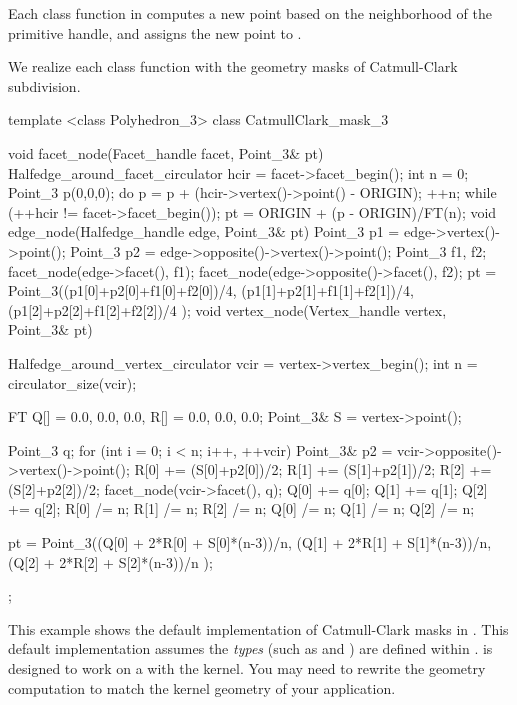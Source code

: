 Each class function in  
computes a new point based on the neighborhood of the primitive 
handle, and assigns the new point to . 

We realize each class function with the geometry masks of 
Catmull-Clark subdivision. 

\begin{ccExampleCode}
template <class Polyhedron_3>
class CatmullClark_mask_3 {
  void facet_node(Facet_handle facet, Point_3& pt) {
    Halfedge_around_facet_circulator hcir = facet->facet_begin();
    int n = 0;
    Point_3 p(0,0,0);
    do {
      p = p + (hcir->vertex()->point() - ORIGIN);
      ++n;
    } while (++hcir != facet->facet_begin());
    pt = ORIGIN + (p - ORIGIN)/FT(n);
  }
  void edge_node(Halfedge_handle edge, Point_3& pt) {
    Point_3 p1 = edge->vertex()->point();
    Point_3 p2 = edge->opposite()->vertex()->point();
    Point_3 f1, f2;
    facet_node(edge->facet(), f1);
    facet_node(edge->opposite()->facet(), f2);
    pt = Point_3((p1[0]+p2[0]+f1[0]+f2[0])/4,
                 (p1[1]+p2[1]+f1[1]+f2[1])/4,
                 (p1[2]+p2[2]+f1[2]+f2[2])/4 );
  }
  void vertex_node(Vertex_handle vertex, Point_3& pt) {
    Halfedge_around_vertex_circulator vcir = vertex->vertex_begin();
    int n = circulator_size(vcir);    

    FT Q[] = {0.0, 0.0, 0.0}, R[] = {0.0, 0.0, 0.0};
    Point_3& S = vertex->point();
    
    Point_3 q;
    for (int i = 0; i < n; i++, ++vcir) {
      Point_3& p2 = vcir->opposite()->vertex()->point();
      R[0] += (S[0]+p2[0])/2;
      R[1] += (S[1]+p2[1])/2;
      R[2] += (S[2]+p2[2])/2;
      facet_node(vcir->facet(), q);
      Q[0] += q[0];      
      Q[1] += q[1];      
      Q[2] += q[2];
    }
    R[0] /= n;    R[1] /= n;    R[2] /= n;
    Q[0] /= n;    Q[1] /= n;    Q[2] /= n;
      
    pt = Point_3((Q[0] + 2*R[0] + S[0]*(n-3))/n,
                 (Q[1] + 2*R[1] + S[1]*(n-3))/n,
                 (Q[2] + 2*R[2] + S[2]*(n-3))/n );
  }
};
\end{ccExampleCode}

This example shows the default implementation of Catmull-Clark 
masks in .
This default implementation assumes the \emph{types} 
(such as  and ) are defined 
within .  
is designed to work on a  with the  
kernel. You may need to rewrite the geometry computation
to match the kernel geometry of your application.

